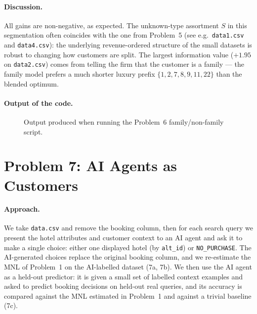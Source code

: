\documentclass[11pt]{article}
\begin{document}
\paragraph{Discussion.}
All gains are non-negative, as expected. The unknown-type assortment
$S$ in this segmentation often coincides with the one from Problem~5
(see e.g.\ \texttt{data1.csv} and \texttt{data4.csv}): the underlying
revenue-ordered structure of the small datasets is robust to changing
how customers are split. The largest information value
($+1.95$ on \texttt{data2.csv}) comes from telling the firm that the
customer is a family --- the family model prefers a much shorter luxury
prefix $\{1,2,7,8,9,11,22\}$ than the blended optimum.

\paragraph{Output of the code.}
\begin{figure}[h!]
  \centering
  \caption{Output produced when running the Problem~6 family/non-family script.}
\end{figure}

\FloatBarrier
\newpage

\section*{Problem 7: AI Agents as Customers}
\label{sec:p7}

\paragraph{Approach.}
We take \texttt{data.csv} and remove the booking column, then for each
search query we present the hotel attributes and customer context to an
AI agent and ask it to make a single choice: either one displayed hotel
(by \texttt{alt\_id}) or \texttt{NO\_PURCHASE}. The AI-generated choices
replace the original booking column, and we re-estimate the MNL of
Problem~1 on the AI-labelled dataset (7a, 7b). We then use the AI agent
as a held-out predictor: it is given a small set of labelled context
examples and asked to predict booking decisions on held-out real
queries, and its accuracy is compared against the MNL estimated in
Problem~1 and against a trivial baseline (7c).
\end{document}
